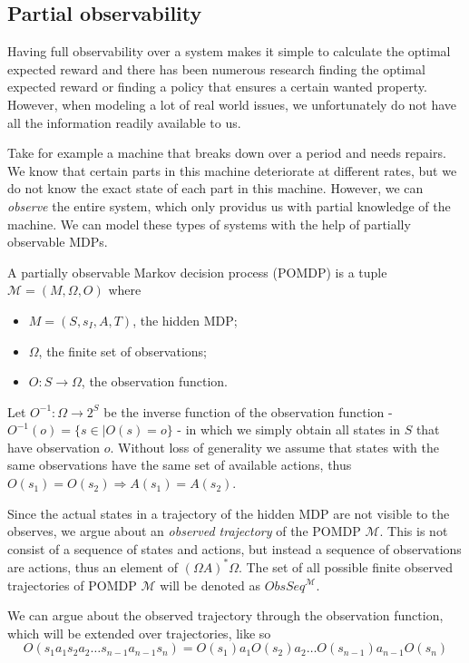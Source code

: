 \subsection{Partial observability}
Having full observability over a system makes it simple to calculate the optimal expected reward and there has been numerous research finding the optimal expected reward or finding a policy that ensures a certain wanted property. However, when modeling a lot of real world issues, we unfortunately do not have all the information readily available to us.

Take for example a machine that breaks down over a period and needs repairs\cite{p:maintenance}. We know that certain parts in this machine deteriorate at different rates, but we do not know the exact state of each part in this machine. However, we can \textit{observe} the entire system, which only providus us with partial knowledge of the machine. We can model these types of systems with the help of partially observable MDPs.

\begin{definition}[POMDP]
	A partially observable Markov decision process (POMDP) is a tuple $\mathcal{M}=(M, \Omega, O)$ where 
	\begin{itemize}
		\item $M=(S,s_I,A,T)$, the hidden MDP;
		\item $\Omega$, the finite set of observations;
		\item $O:S\to \Omega$, the observation function. 
	\end{itemize}
\end{definition}

Let $O^{-1}:\Omega\to 2^S$ be the inverse function of the observation function - $O^{-1}(o)=\{s\in \mid O(s)=o\}$ - in which we simply obtain all states in $S$ that have observation $o$.
Without loss of generality we assume that states with the same observations have the same set of available actions, thus $O(s_1)=O(s_2)\Rightarrow A(s_1)=A(s_2)$.

Since the actual states in a trajectory of the hidden MDP are not visible to the observes, we argue about an \textit{observed trajectory} of the POMDP $\mathcal{M}$. This is not consist of a sequence of states and actions, but instead a sequence of observations are actions, thus an element of $(\Omega A)^*\Omega$. The set of all possible finite observed trajectories of POMDP $\mathcal{M}$ will be denoted as $ObsSeq^{\mathcal{M}}$.

We can argue about the observed trajectory through the observation function, which will be extended over trajectories, like so
\[O(s_1 a_1 s_2 a_2\dots s_{n-1} a_{n-1} s_n) = O(s_1) a_1 O(s_2) a_2\dots O(s_{n-1}) a_{n-1} O(s_n)\]

